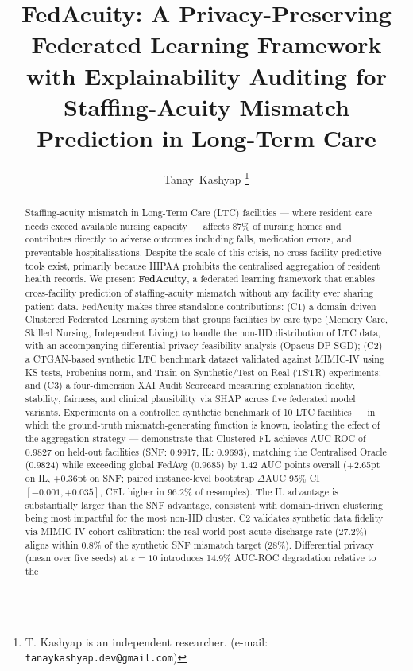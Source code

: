\documentclass[journal]{IEEEtran}
\title{FedAcuity: A Privacy-Preserving Federated Learning Framework with
Explainability Auditing for Staffing-Acuity Mismatch Prediction
in Long-Term Care}
\author{Tanay~Kashyap%
  \thanks{T. Kashyap is an independent researcher.
  (e-mail: \texttt{tanaykashyap.dev@gmail.com})}%
}
\begin{document}
\maketitle

\begin{abstract}
Staffing-acuity mismatch in Long-Term Care (LTC) facilities — where resident
care needs exceed available nursing capacity — affects 87\% of nursing homes
and contributes directly to adverse outcomes including falls, medication errors,
and preventable hospitalisations. Despite the scale of this crisis, no
cross-facility predictive tools exist, primarily because HIPAA prohibits the
centralised aggregation of resident health records. We present
\textbf{FedAcuity}, a federated learning framework that enables cross-facility
prediction of staffing-acuity mismatch without any facility ever sharing patient
data. FedAcuity makes three standalone contributions: (C1) a domain-driven
Clustered Federated Learning system that groups facilities by care type
(Memory Care, Skilled Nursing, Independent Living) to handle the non-IID
distribution of LTC data, with an accompanying differential-privacy
feasibility analysis (Opacus DP-SGD); (C2) a
CTGAN-based synthetic LTC benchmark dataset validated against MIMIC-IV using
KS-tests, Frobenius norm, and Train-on-Synthetic/Test-on-Real (TSTR)
experiments; and (C3) a four-dimension XAI Audit Scorecard measuring
explanation fidelity, stability, fairness, and clinical plausibility via SHAP
across five federated model variants. Experiments on a controlled synthetic
benchmark of 10 LTC facilities --- in which the ground-truth mismatch-generating
function is known, isolating the effect of the aggregation strategy ---
demonstrate that Clustered FL
achieves AUC-ROC of 0.9827 on held-out facilities (SNF: 0.9917, IL: 0.9693),
matching the Centralised Oracle (0.9824) while exceeding global
FedAvg (0.9685) by 1.42 AUC points overall (+2.65pt on IL, +0.36pt on SNF;
paired instance-level bootstrap $\Delta$AUC 95\% CI $[-0.001, +0.035]$, CFL
higher in 96.2\% of resamples). The IL advantage is
substantially larger than the SNF advantage, consistent with
domain-driven clustering being most impactful for the most non-IID cluster.
C2 validates synthetic data fidelity via MIMIC-IV cohort calibration:
the real-world post-acute discharge rate (27.2\%) aligns within 0.8\% of
the synthetic SNF mismatch target (28\%). Differential privacy (mean over five seeds) at
$\varepsilon = 10$ introduces 14.9\% AUC-ROC degradation relative to the

\end{abstract}
\end{document}
